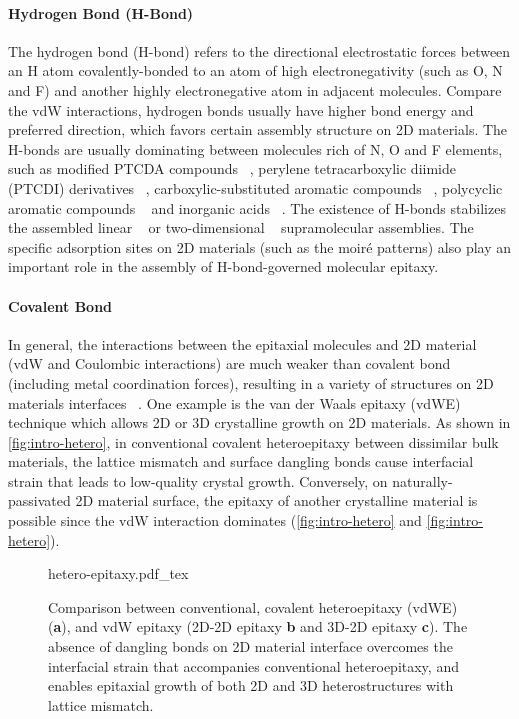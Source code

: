 \paragraph{Hydrogen Bond (H-Bond)}

The hydrogen bond (H-bond) refers to the directional electrostatic
forces between an H atom covalently-bonded to an atom of high
electro\-negativity (such as O, N and F) and another highly
electro\-negative atom in adjacent molecules. Compare the vdW
interactions, hydrogen bonds usually have higher bond energy and
preferred direction, which favors certain assembly structure on 2D
materials. The H-bonds are usually dominating between molecules rich
of N, O and F elements, such as modified PTCDA compounds
~\autocite{Mura_2010_DFT_H_bond_PTCDA_gr,Karmel_2014_assembl_hetero_gr},
perylene tetra\-carboxylic diimide (PTCDI) derivatives
~\autocite{Pollard_2010_hbond_assembly_gr,Karmel_2014_PTCDI_gr},
carboxylic-substituted aromatic compounds
~\autocite{Rochefort_2009_aro_graphene_mech,Addou_2013_TPA_gr}, polycyclic
aromatic compounds
~\autocite{Kozlov_2012_polyaro_gr,Roos_2011_BTP_gr,Meier_2010_polycyclic_gr}
and inorganic acids ~\autocite{Prado_2011_2D_acid_gr}. The existence of
H-bonds stabilizes the assembled  linear
~\autocite{Pollard_2010_hbond_assembly_gr} or two-dimensional
~\autocite{Prado_2011_2D_acid_gr} supra\-molecular assemblies. The specific
adsorption sites on 2D materials (such as the moiré patterns) also
play an important role in the assembly of H-bond-governed molecular
epitaxy.


\paragraph{Covalent Bond}
In general, the interactions between the epitaxial molecules and 2D
material (vdW and Coulombic interactions) are much weaker than
covalent bond (including metal coordination forces), resulting in a
variety of structures on 2D materials interfaces
~\autocite{Bakti_Utama_2013_rev_epitax}. One example is the van der Waals
epitaxy (vdWE) technique which allows 2D or 3D crystalline growth on
2D materials. As shown in \autoref{fig:intro-hetero}, in conventional
covalent heteroepitaxy between dissimilar bulk materials, the lattice
mismatch and surface dangling bonds cause interfacial strain that
leads to low-quality crystal growth. Conversely, on
naturally-passivated 2D material surface, the epitaxy of another
crystalline material is possible since the vdW interaction dominates
(\autoref{fig:intro-hetero} and \autoref{fig:intro-hetero}).
\begin{figure}[h]
  \centering
  {hetero-epitaxy.pdf_tex}
  \caption{\label{fig:intro-hetero} %
    Comparison between conventional, covalent hetero\-epitaxy (vdWE)
    (\textbf{a}), and vdW epitaxy (2D-2D epitaxy \textbf{b} and 3D-2D
    epitaxy \textbf{c}). The absence of dangling bonds on 2D material
    interface overcomes the interfacial strain that accompanies
    conventional hetero\-epitaxy, and enables epitaxial growth of both
    2D and 3D heterostructures with lattice mismatch.%
  }
\end{figure}

